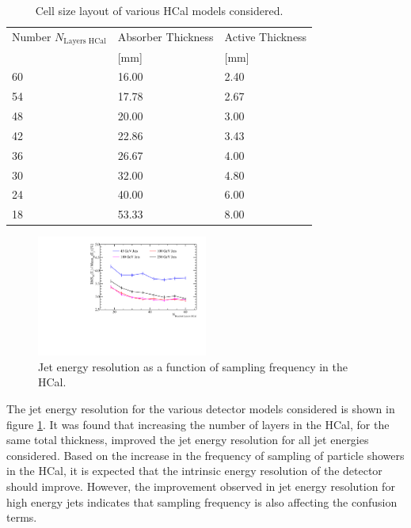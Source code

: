 \begin{table}[h!]
\centering
\begin{tabular}{ l l l }
\hline
Number $N_{\text{Layers HCal}}$& Absorber Thickness & Active Thickness \\
 & [mm] & [mm] \\
\hline
60 & 16.00 & 2.40 \\ 
54 & 17.78 & 2.67 \\
48 & 20.00 & 3.00 \\
42 & 22.86 & 3.43 \\
36 & 26.67 & 4.00 \\
30 & 32.00 & 4.80 \\
24 & 40.00 & 6.00 \\
18 & 53.33 & 8.00 \\
\hline
\end{tabular}
\caption[Cell size layout of various HCal models considered.]{Cell size layout of various HCal models considered.}
\label{table:nlayershcaloption}
\end{table}

\begin{figure}
\centering
\includegraphics[width=0.5\textwidth]{OptimisationStudies/Plots/JetEnergyResolutions/JER_vs_NumberOfLayersInTheHCal.pdf}
\caption[Jet energy resolution as a function of sampling frequency in the HCal.]{Jet energy resolution as a function of sampling frequency in the HCal.}
\label{fig:hcalnlayers}
\end{figure}

The jet energy resolution for the various detector models considered is shown in figure \ref{fig:hcalnlayers}.  It was found that increasing the number of layers in the HCal, for the same total thickness, improved the jet energy resolution for all jet energies considered.  Based on the increase in the frequency of sampling of particle showers in the HCal, it is expected that the intrinsic energy resolution of the detector should improve.  However, the improvement observed in jet energy resolution for high energy jets indicates that sampling frequency is also affecting the confusion terms.

